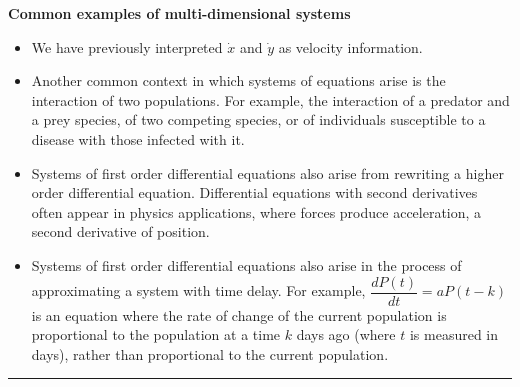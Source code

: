 \documentclass[12pt,letterpaper,noanswers]{exam}
\begin{document}
    \noindent\textbf{Common examples of multi-dimensional systems}
    \begin{tcolorbox}
    \begin{itemize}
    \itemsep0em
    \item We have previously interpreted $\dot x$ and $\dot y$ as velocity information.
    \item Another common context in which systems of equations arise is the interaction of two populations.  For example, the interaction of a predator and a prey species, of two competing species, or of individuals susceptible to a disease with those infected with it.
    \item Systems of first order differential equations also arise from rewriting a higher order differential equation.  Differential equations with second derivatives often appear in physics applications, where forces produce acceleration, a second derivative of position.
    \item Systems of first order differential equations also arise in the process of approximating a system with time delay.  For example, $\dfrac{dP(t)}{dt} = aP(t-k)$ is an equation where the rate of change of the current population is proportional to the population at a time $k$ days ago (where $t$ is measured in days), rather than proportional to the current population.  
\end{itemize}
\end{tcolorbox}


\vspace{0.2cm}
\hrule
\vspace{0.2cm}
\end{document}
